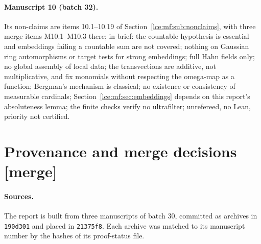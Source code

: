 \documentclass[11pt,letterpaper]{article}
\numberwithin{equation}{section}
\theoremstyle{definition}
\theoremstyle{remark}
\newcommand{\mergetag}{\textup{\textsf{\small[merge]}}}%
\begin{document}
\paragraph{Manuscript 10 (batch 32).} Its non-claims are items 10.1--10.19
of Section~\ref{lce:mf:sub:nonclaims}, with three merge items M10.1--M10.3
there; in brief: the countable hypothesis is essential and embeddings
failing a countable sum are not covered; nothing on Gaussian ring
automorphisms or target tests for strong embeddings; full Hahn fields only;
no global assembly of local data; the transvections are additive, not
multiplicative, and fix monomials without respecting the omega-map as a
function; Bergman's mechanism is classical; no existence or consistency of
measurable cardinals; Section~\ref{lce:mf:sec:embeddings} depends on this
report's absoluteness lemma; the finite checks verify no ultrafilter;
unrefereed, no Lean, priority not certified.

\section{Provenance and merge decisions \mergetag}\label{lce:app:provenance}

\paragraph{Sources.} The report is built from three manuscripts of batch 30,
committed as archives in \texttt{190d301} and placed in \texttt{21375f8}.
Each archive was matched to its manuscript number by the hashes of its
proof-status file.
\end{document}

